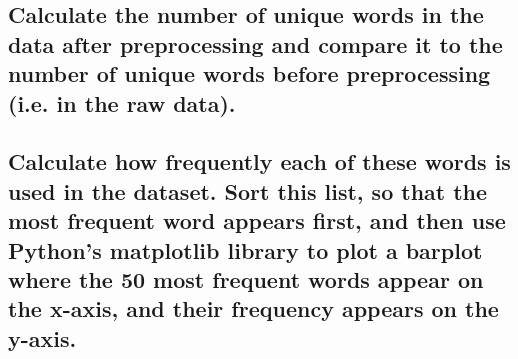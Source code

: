 \documentclass[a4paper,12pt]{article}
\begin{document}
\subsection[]{Calculate the number of unique words in the data after preprocessing and compare it to the number of unique words before preprocessing (i.e. in the raw data).}
\subsection[]{Calculate how frequently each of these words is used in the dataset. Sort this list, so that the most frequent word appears first, and then use Python's matplotlib library to plot a barplot where the 50 most frequent words appear on the x-axis, and their frequency appears on the y-axis.}
\end{document}
